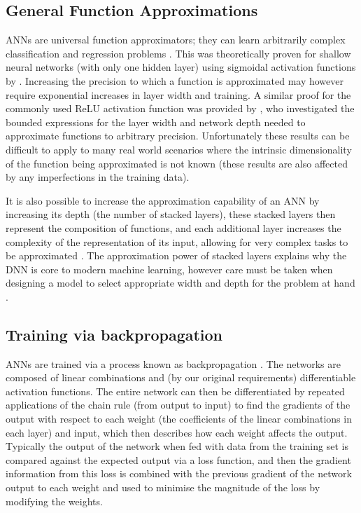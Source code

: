 \subsection{General Function Approximations}

ANNs are universal function approximators; they can learn arbitrarily complex classification and regression problems \citep{Rumelhart1986,1989Cybenko}.
This was theoretically proven for shallow neural networks (with only one hidden layer) using sigmoidal activation functions by \citet{1989Cybenko}.
Increasing the precision to which a function is approximated may however require exponential increases in layer width and training.
A similar proof for the commonly used ReLU activation function was provided by \citet{Lu2017}, who investigated the bounded expressions for the layer width and network depth needed to approximate functions to arbitrary precision.
Unfortunately these results can be difficult to apply to many real world scenarios where the intrinsic dimensionality of the function being approximated is not known (these results are also affected by any imperfections in the training data).

It is also possible to increase the approximation capability of an ANN by increasing its depth (the number of stacked layers), these stacked layers then represent the composition of functions, and each additional layer increases the complexity of the representation of its input, allowing for very complex tasks to be approximated \citep{Raschka2015}.
The approximation power of stacked layers explains why the DNN is core to modern machine learning, however care must be taken when designing a model to select appropriate width and depth for the problem at hand \citep{Lu2017}.

\subsection{Training via backpropagation}

ANNs are trained via a process known as backpropagation \citep{Rumelhart1986}.
The networks are composed of linear combinations and (by our original requirements) differentiable activation functions.
The entire network can then be differentiated by repeated applications of the chain rule (from output to input) to find the gradients of the output with respect to each weight (the coefficients of the linear combinations in each layer) and input, which then describes how each weight affects the output.
Typically the output of the network when fed with data from the training set is compared against the expected output via a loss function, and then the gradient information from this loss is combined with the previous gradient of the network output to each weight and used to minimise the magnitude of the loss by modifying the weights.

